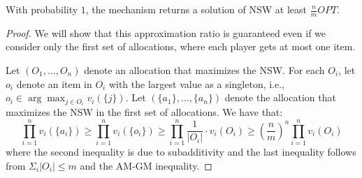 \documentclass{theoretics}
\begin{document}
\begin{lemma}\label{algs-approx-mn}
With probability $1$, the mechanism returns a solution of NSW at least $\frac{n}{m} OPT$.
\end{lemma}
\begin{proof}
We will show that this approximation ratio is guaranteed even if we consider only the first set of allocations, where each player gets at most one item. 

Let $(O_1,\ldots, O_n)$ denote an allocation that maximizes the NSW. For each $O_i$, let $o_i$ denote an item in $O_i$ with the largest value as a singleton, i.e., $o_i\in \arg\max_{j\in O_i}v_i(\{j\})$. Let $(\{a_1\},\ldots, \{a_n\})$ denote the allocation that maximizes the NSW in the first set of allocations. We have that:
$$
\prod_{i=1}^{n} v_i(\{a_i\}) \geq \prod_{i=1}^{n}  v_i(\{o_i\}) \geq \prod_{i=1}^{n}  \frac {1} {|O_i|} \cdot v_i(O_i) \geq \left(\frac n m \right)^n \prod_{i=1}^{n}   v_i(O_i)
$$
where the second inequality is due to subadditivity and the last inequality follows from $\Sigma_i|O_i|\leq m$ and the AM-GM inequality.
\end{proof}
\end{document}
